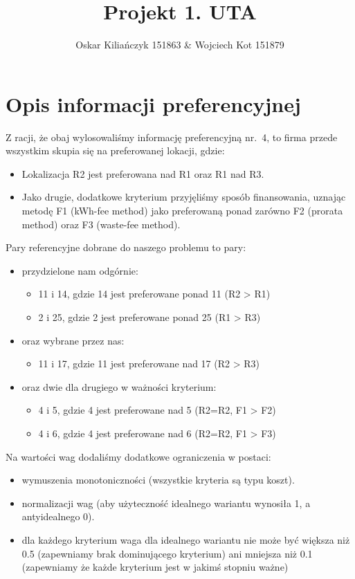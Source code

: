 \documentclass[11pt]{article}
\title{Projekt 1. UTA}
\author{Oskar Kiliańczyk 151863 \& Wojciech Kot 151879}
\date{}
\begin{document}
\maketitle
\newpage

\section{Opis informacji preferencyjnej}\label{sec:opis-informacji-preferencyjnej}

Z racji, że obaj wylosowaliśmy informację preferencyjną nr.\ 4, to firma przede wszystkim skupia się na preferowanej lokacji, gdzie:
\begin{itemize}
\item Lokalizacja R2 jest preferowana nad R1 oraz R1 nad R3.
\item Jako drugie, dodatkowe kryterium przyjęliśmy sposób finansowania, uznając metodę F1 (kWh-fee method) jako preferowaną ponad zarówno F2 (prorata method) oraz F3 (waste-fee method).
\end{itemize}

Pary referencyjne dobrane do naszego problemu to pary:
\begin{itemize}
\item przydzielone nam odgórnie:
\begin{itemize}
\item 11 i 14, gdzie 14 jest preferowane ponad 11 (R2 > R1)
\item 2 i 25, gdzie 2 jest preferowane ponad 25 (R1 > R3)
\end{itemize}
\item oraz wybrane przez nas:
\begin{itemize}
\item 11 i 17, gdzie 11 jest preferowane nad 17 (R2 > R3)
\end{itemize}
\item oraz dwie dla drugiego w ważności kryterium:
\begin{itemize}
\item 4 i 5, gdzie 4 jest preferowane nad 5 (R2=R2, F1 > F2)
\item 4 i 6,  gdzie 4 jest preferowane nad 6 (R2=R2, F1 > F3)
\end{itemize}
\end{itemize}

Na wartości wag dodaliśmy dodatkowe ograniczenia w postaci:
\begin{itemize}
\item wymuszenia monotoniczności (wszystkie kryteria są typu koszt).
\item normalizacji wag (aby użyteczność idealnego wariantu wynosiła 1, a antyidealnego 0).
\item dla każdego kryterium waga dla idealnego wariantu nie może być większa niż 0.5 (zapewniamy brak dominującego kryterium)
ani mniejsza niż 0.1 (zapewniamy że każde kryterium jest w jakimś stopniu ważne)
\end{itemize}
\end{document}
